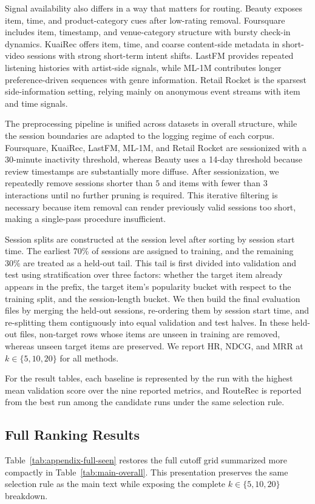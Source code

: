 \documentclass[sigconf,review,anonymous]{acmart}
\begin{document}
Signal availability also differs in a way that matters for routing. Beauty exposes item, time, and product-category cues after low-rating removal. Foursquare includes item, timestamp, and venue-category structure with bursty check-in dynamics. KuaiRec offers item, time, and coarse content-side metadata in short-video sessions with strong short-term intent shifts. LastFM provides repeated listening histories with artist-side signals, while ML-1M contributes longer preference-driven sequences with genre information. Retail Rocket is the sparsest side-information setting, relying mainly on anonymous event streams with item and time signals.

The preprocessing pipeline is unified across datasets in overall structure, while the session boundaries are adapted to the logging regime of each corpus. Foursquare, KuaiRec, LastFM, ML-1M, and Retail Rocket are sessionized with a 30-minute inactivity threshold, whereas Beauty uses a 14-day threshold because review timestamps are substantially more diffuse. After sessionization, we repeatedly remove sessions shorter than $5$ and items with fewer than $3$ interactions until no further pruning is required. This iterative filtering is necessary because item removal can render previously valid sessions too short, making a single-pass procedure insufficient.

Session splits are constructed at the session level after sorting by session start time. The earliest 70\% of sessions are assigned to training, and the remaining 30\% are treated as a held-out tail. This tail is first divided into validation and test using stratification over three factors: whether the target item already appears in the prefix, the target item's popularity bucket with respect to the training split, and the session-length bucket. We then build the final evaluation files by merging the held-out sessions, re-ordering them by session start time, and re-splitting them contiguously into equal validation and test halves. In these held-out files, non-target rows whose items are unseen in training are removed, whereas unseen target items are preserved. We report HR, NDCG, and MRR at $k\in\{5,10,20\}$ for all methods.

For the result tables, each baseline is represented by the run with the highest mean validation score over the nine reported metrics, and RouteRec is reported from the best run among the candidate runs under the same selection rule.

\subsection{Full Ranking Results}
Table~\ref{tab:appendix-full-seen} restores the full cutoff grid summarized more compactly in Table~\ref{tab:main-overall}. This presentation preserves the same selection rule as the main text while exposing the complete $k\in\{5,10,20\}$ breakdown.
\end{document}

